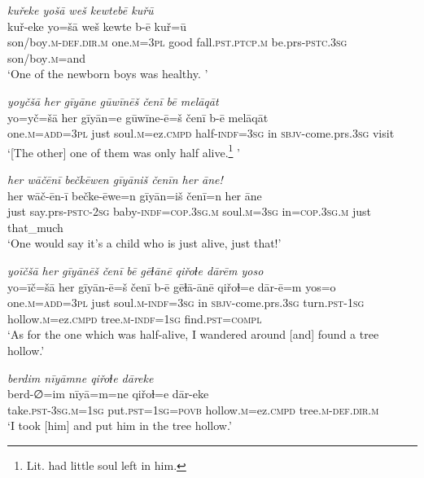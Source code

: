 \ea \label{ZQ.17}
\textit{kuřeke yošā weš kewtebē kuřū} \\ 
\gll kuř-eke yo=šā weš kewte b-ē kuř=ū \\ 
 son/boy\textsc{.m}\textsc{-def}\textsc{.dir}\textsc{.m} one\textsc{.m}\textsc{=3pl} good fall\textsc{.pst}\textsc{.ptcp}\textsc{.m} be.prs\textsc{-pstc}\textsc{.3sg} son/boy\textsc{.m}=and \\ 
\glt `One of the newborn boys was healthy. '
\z 
 
\ea \label{ZQ.19}
\textit{yoyčšā her gīyāne gūwīnēš čenī bē melāqāt} \\ 
\gll yo=yč=šā her gīyān=e gūwīne-ē=š čenī b-ē melāqāt \\ 
 one\textsc{.m}\textsc{=add}\textsc{=3pl} just soul\textsc{.m}=ez\textsc{.cmpd} half\textsc{-indf}\textsc{=3sg} in \textsc{sbjv-}come.prs\textsc{.3sg} visit \\ 
\glt `[The other] one of them was only half alive.\footnote{Lit. had little soul left in him.}    '
\z 
 
\ea \label{ZQ.20}
\textit{her wāčēnī bečkēwen gīyāniš čenīn her āne!} \\ 
\gll her wāč-ēn-ī bečke-ēwe=n gīyān=iš čenī=n her āne \\ 
 just say.prs\textsc{-pstc}-\textsc{2sg} baby\textsc{-indf}\textsc{=cop}\textsc{.3sg}\textsc{.m} soul\textsc{.m}\textsc{=3sg} in\textsc{=cop}\textsc{.3sg}\textsc{.m} just that\_much \\ 
\glt `One would say it’s a child who is just alive, just that!'
\z 
 
\ea \label{ZQ.23}
\textit{yoīčšā her gīyānēš čenī bē gēɫānē qiřoɫe dārēm yoso} \\ 
\gll yo=īč=šā her gīyān-ē=š čenī b-ē gēɫā-ānē qiřoɫ=e dār-ē=m yos=o \\ 
 one\textsc{.m}\textsc{=add}\textsc{=3pl} just soul\textsc{.m}\textsc{-indf}\textsc{=3sg} in \textsc{sbjv-}come.prs\textsc{.3sg} turn\textsc{.pst}\textsc{-\textsc{1sg}} hollow\textsc{.m}=ez\textsc{.cmpd} tree\textsc{.m}\textsc{-indf}\textsc{=\textsc{1sg}} find\textsc{.pst}\textsc{=compl} \\ 
\glt `As for the one which was half-alive, I wandered around [and] found a tree hollow.'
\z 
 
\ea \label{ZQ.24}
\textit{berdim nīyāmne qiřoɫe dāreke} \\ 
\gll berd-∅=im nīyā=m=ne qiřoɫ=e dār-eke \\ 
 take\textsc{.pst}\textsc{-3sg}\textsc{.m}\textsc{=\textsc{1sg}} put\textsc{.pst}\textsc{=\textsc{1sg}}\textsc{=\textsc{povb}} hollow\textsc{.m}=ez\textsc{.cmpd} tree\textsc{.m}\textsc{-def}\textsc{.dir}\textsc{.m} \\ 
\glt `I took [him] and put him in the tree hollow.'
\z 
 
